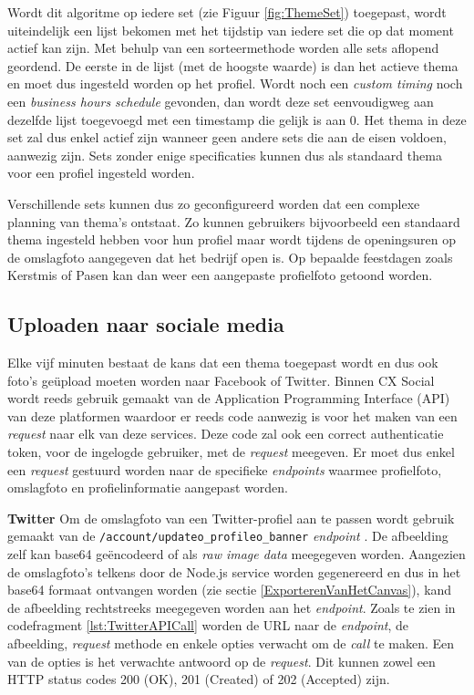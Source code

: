 Wordt dit algoritme op iedere set (zie Figuur \ref{fig:ThemeSet}) toegepast, wordt uiteindelijk een lijst bekomen met het tijdstip van iedere set die op dat moment actief kan zijn. Met behulp van een sorteermethode worden alle sets aflopend geordend. De eerste in de lijst (met de hoogste waarde) is dan het actieve thema en moet dus ingesteld worden op het profiel. Wordt noch een \textit{custom timing} noch een \textit{business hours schedule} gevonden, dan wordt deze set eenvoudigweg aan dezelfde lijst toegevoegd met een timestamp die gelijk is aan 0. Het thema in deze set zal dus enkel actief zijn wanneer geen andere sets die aan de eisen voldoen, aanwezig zijn. Sets zonder enige specificaties kunnen dus als standaard thema voor een profiel ingesteld worden. 

Verschillende sets kunnen dus zo geconfigureerd worden dat een complexe planning van thema's ontstaat. Zo kunnen gebruikers bijvoorbeeld een standaard thema ingesteld hebben voor hun profiel maar wordt tijdens de openingsuren op de omslagfoto aangegeven dat het bedrijf open is. Op bepaalde feestdagen zoals Kerstmis of Pasen kan dan weer een aangepaste profielfoto getoond worden. 

\subsection{Uploaden naar sociale media}
Elke vijf minuten bestaat de kans dat een thema toegepast wordt en dus ook foto's ge\"{u}pload moeten worden naar Facebook of Twitter. Binnen CX Social wordt reeds gebruik gemaakt van de Application Programming Interface (API) van deze platformen waardoor er reeds code aanwezig is voor het maken van een \textit{request} naar elk van deze services. Deze code zal ook een correct authenticatie token, voor de ingelogde gebruiker, met de \textit{request} meegeven. %
Er moet dus enkel een \textit{request} gestuurd worden naar de specifieke \textit{endpoints} waarmee profielfoto, omslagfoto en profielinformatie aangepast worden. 

\textbf{Twitter} \break
Om de omslagfoto van een Twitter-profiel aan te passen wordt gebruik gemaakt van de \texttt{/account/updateo{\_}profileo{\_}banner} \textit{endpoint} \cite{TwitterAPIDoc}. De afbeelding zelf kan base64 ge\"{e}ncodeerd of als \textit{raw image data} meegegeven worden. Aangezien de omslagfoto's telkens door de Node.js service worden gegenereerd en dus in het base64 formaat ontvangen worden (zie sectie \ref{ExporterenVanHetCanvas}), kand de afbeelding rechtstreeks meegegeven worden aan het \textit{endpoint}. Zoals te zien in codefragment \ref{lst:TwitterAPICall} worden de URL naar de \textit{endpoint}, de afbeelding, \textit{request} methode en enkele opties verwacht om de \textit{call} te maken. Een van de opties is het verwachte antwoord op de \textit{request}. Dit kunnen zowel een HTTP status codes 200 (OK), 201 (Created) of 202 (Accepted) zijn. 

